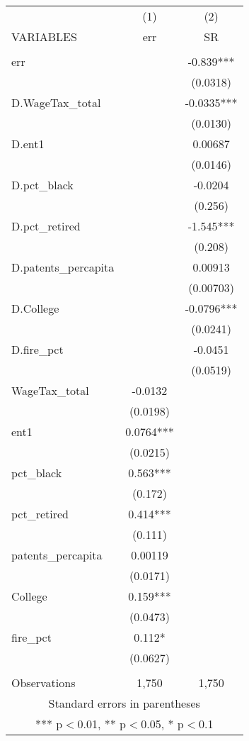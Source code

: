 \begin{tabular}{lcc} \hline
 & (1) & (2) \\
VARIABLES & err & SR \\ \hline
 &  &  \\
err &  & -0.839*** \\
 &  & (0.0318) \\
D.WageTax\_total &  & -0.0335*** \\
 &  & (0.0130) \\
D.ent1 &  & 0.00687 \\
 &  & (0.0146) \\
D.pct\_black &  & -0.0204 \\
 &  & (0.256) \\
D.pct\_retired &  & -1.545*** \\
 &  & (0.208) \\
D.patents\_percapita &  & 0.00913 \\
 &  & (0.00703) \\
D.College &  & -0.0796*** \\
 &  & (0.0241) \\
D.fire\_pct &  & -0.0451 \\
 &  & (0.0519) \\
WageTax\_total & -0.0132 &  \\
 & (0.0198) &  \\
ent1 & 0.0764*** &  \\
 & (0.0215) &  \\
pct\_black & 0.563*** &  \\
 & (0.172) &  \\
pct\_retired & 0.414*** &  \\
 & (0.111) &  \\
patents\_percapita & 0.00119 &  \\
 & (0.0171) &  \\
College & 0.159*** &  \\
 & (0.0473) &  \\
fire\_pct & 0.112* &  \\
 & (0.0627) &  \\
 &  &  \\
 Observations & 1,750 & 1,750 \\ \hline
\multicolumn{3}{c}{ Standard errors in parentheses} \\
\multicolumn{3}{c}{ *** p$<$0.01, ** p$<$0.05, * p$<$0.1} \\
\end{tabular}
